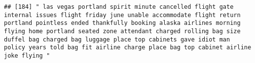 \documentclass[
]{article}
\begin{document}
\begin{verbatim}
## [184] " las vegas portland spirit minute cancelled flight gate internal issues flight friday june unable accommodate flight return portland pointless ended thankfully booking alaska airlines morning flying home portland seated zone attendant charged rolling bag size duffel bag charged bag luggage place top cabinets gave idiot man policy years told bag fit airline charge place bag top cabinet airline joke flying "                                                                                                                                                                                                                                                                                                                                                                                                                                                                                                                                                                                                                                                                                                                                                                                                                                                                                                                                                                                                                                                                                                                                                                                                                                                                                                                                                                      

\end{verbatim}
\end{document}
